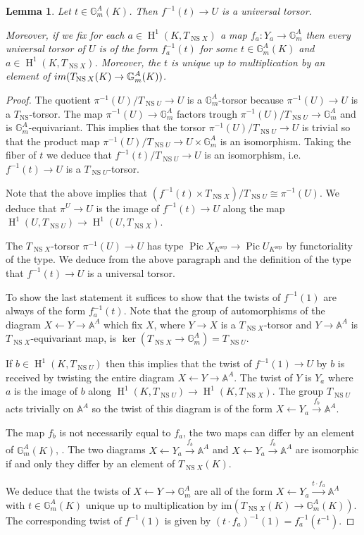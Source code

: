 \documentclass[a4paper,11pt,reqno]{amsart}
\newcommand{\G}{\mathbb{G}}
\newcommand{\A}{\mathbb{A}}
\DeclareMathOperator{\Pic}{Pic}
\DeclareMathOperator{\NS}{NS}
\DeclareMathOperator{\HH}{H}
\DeclareMathOperator{\sep}{sep}
\newtheorem{lemma}[theorem]{Lemma}
\theoremstyle{definition}
\begin{document}
\begin{lemma}\label{lem:Universal torsor of open subvariety}
	Let $t \in \G_m^A(K)$. Then $f^{-1}(t) \to U$ is a universal torsor.
	
	Moreover, if we fix for each $a \in \HH^1(K, T_{\NS X})$ a map $f_a: Y_a \to \G_m^A$ then every universal torsor of $U$ is of the form $f_a^{-1}(t)$ for some $t \in \G_m^A(K)$ and $a \in \HH^1(K, T_{\NS X})$. Moreover, the $t$ is unique up to multiplication by an element of $\emph{im}(T_{\NS X}(K) \to \G_m^A(K))$.
\end{lemma}
\begin{proof}
	The quotient $\pi^{-1}(U)/ T_{\NS U} \to U$ is a $\G_m^A$-torsor because $\pi^{-1}(U) \to U$ is a $T_{\NS}$-torsor. The map $\pi^{-1}(U) \to \G_m^A$ factors trough $\pi^{-1}(U)/ T_{\NS U} \to \G_m^A$ and is $\G_m^A$-equivariant. This implies that the torsor $\pi^{-1}(U)/ T_{\NS U} \to U$ is trivial so that the product map $\pi^{-1}(U)/ T_{\NS U} \to U \times \G_m^A$ is an isomorphism. Taking the fiber of $t$ we deduce that $f^{-1}(t)/T_{\NS U} \to U$ is an isomorphism, i.e.~$f^{-1}(t) \to U$ is a $T_{\NS U}$-torsor.
	
	Note that the above implies that $(f^{-1}(t) \times T_{\NS X})/T_{\NS U} \cong \pi^{-1}(U)$. We deduce that $\pi^{U} \to U$ is the image of $f^{-1}(t) \to U$ along the map $\HH^1(U, T_{\NS U}) \to \HH^1(U, T_{\NS X})$.
	
	The $T_{\NS X}$-torsor $\pi^{-1}(U) \to U$ has type $\Pic X_{K^{\sep}} \to \Pic U_{K^{\sep}}$ by functoriality of the type. We deduce from the above paragraph and the definition of the type that $f^{-1}(t) \to U$ is a universal torsor.
	
	To show the last statement it suffices to show that the twists of $f^{-1}(1)$ are always of the form $f_a^{-1}(t)$. Note that the group of automorphisms of the diagram $X \leftarrow Y \to \A^{A}$ which fix $X$, where $Y \to X$ is a $T_{\NS X}$-torsor and $Y \to \A^{A}$ is $T_{\NS X}$-equivariant map, is $\ker(T_{\NS X} \to \G_m^A) = T_{\NS U}$. 
	
	If $b \in \HH^1(K, T_{\NS U})$ then this implies that the twist of $f^{-1}(1) \to U$ by $b$ is received by twisting the entire diagram $X \leftarrow Y \to \A^{A}$. The twist of $Y$ is $Y_a$ where $a$ is the image of $b$ along $\HH^1(K, T_{\NS U}) \to \HH^1(K, T_{\NS X})$. The group $T_{\NS U}$ acts trivially on $\A^A$ so the twist of this diagram is of the form $X \leftarrow Y_a \xrightarrow{f_b} \A^{A}$. 
	
	The map $f_b$ is not necessarily equal to $f_a$, the two maps can differ by an element of $\G_m^A(K)$, . The two diagrams $X \leftarrow Y_a \xrightarrow{f_b} \A^{A}$ and $X \leftarrow Y_a \xrightarrow{f_b} \A^{A}$ are isomorphic if and only they differ by an element of $T_{\NS X}(K)$.
	
	We deduce that the twists of $X \leftarrow Y \to \G_m^{A}$ are all of the form $X \leftarrow Y_a \xrightarrow{t \cdot f_a} \A^{A}$ with $t \in \G_m^A(K)$ unique up to multiplication by $\text{im}(T_{\NS X}(K) \to \G_m^A(K))$. The corresponding twist of $f^{-1}(1)$ is given by $(t\cdot f_a)^{-1}(1) = f_a^{-1}(t^{-1})$.
	\end{proof}
\end{document}
